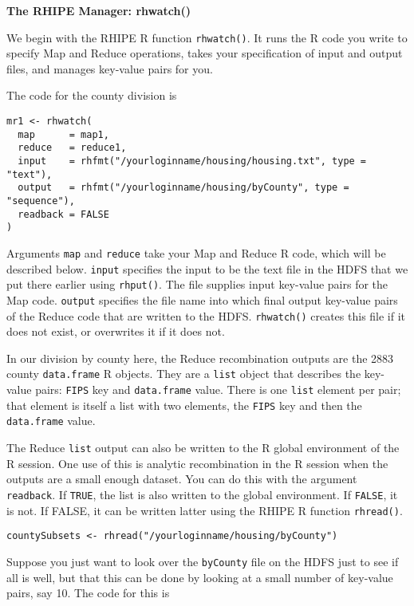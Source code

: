\textbf{The RHIPE Manager: rhwatch()}

We begin with the RHIPE R function \texttt{rhwatch()}. It
runs the R code you write to specify
Map and Reduce operations, takes your specification of input and
output files, and manages key-value pairs for you.

The code for the county division is

\begin{verbatim}
mr1 <- rhwatch(
  map      = map1,
  reduce   = reduce1,
  input    = rhfmt("/yourloginname/housing/housing.txt", type = "text"),
  output   = rhfmt("/yourloginname/housing/byCounty", type = "sequence"),
  readback = FALSE
)
\end{verbatim}

Arguments \texttt{map} and \texttt{reduce} take your Map and Reduce R code, which will be
described below. \texttt{input} specifies the input to be the text file in the HDFS
that we put there earlier using \texttt{rhput()}. The file supplies input key-value
pairs for the Map code.  \texttt{output} specifies the file name
into which final output key-value pairs of the Reduce code that are written to
the HDFS. \texttt{rhwatch()} creates this file if it does not exist, or overwrites it
if it does not.

In our division by county here, the Reduce recombination outputs are the
2883 county \texttt{data.frame} R objects. They are a \texttt{list} object that describes the
key-value pairs: \texttt{FIPS} key and \texttt{data.frame} value. There is one \texttt{list} element
per pair; that element is itself a list with two elements, the \texttt{FIPS} key and
then the \texttt{data.frame} value.

The Reduce \texttt{list} output can also be written to the R global environment of
the R session. One use of this is analytic recombination in the R session
when the outputs are a small enough dataset. You can do this with the argument
\texttt{readback}.  If \texttt{TRUE}, the list is also written to the global environment.
If \texttt{FALSE}, it is not. If FALSE, it can be written latter using the RHIPE R
function \texttt{rhread()}.

\begin{verbatim}
countySubsets <- rhread("/yourloginname/housing/byCounty")
\end{verbatim}

Suppose you just want to look over the \texttt{byCounty} file on the HDFS just to see
if all is well, but that this can be done by looking at a small number of
key-value pairs, say 10. The code for this is

